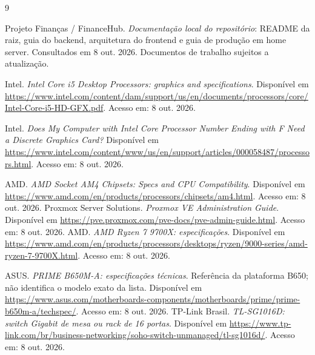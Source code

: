 \documentclass[11pt,a4paper,oneside]{report}
\begin{document}
\begin{thebibliography}{9}
 Projeto Finanças / FinanceHub.
\textit{Documentação local do repositório}: README da raiz, guia do backend,
arquitetura do frontend e guia de produção em home server.
Consultados em 8 out. 2026. Documentos de trabalho sujeitos a atualização.

 Intel.
\textit{Intel Core i5 Desktop Processors: graphics and specifications}.
Disponível em
\url{https://www.intel.com/content/dam/support/us/en/documents/processors/core/Intel-Core-i5-HD-GFX.pdf}.
Acesso em: 8 out. 2026.

 Intel.
\textit{Does My Computer with Intel Core Processor Number Ending with F Need a Discrete Graphics Card?}
Disponível em
\url{https://www.intel.com/content/www/us/en/support/articles/000058487/processors.html}.
Acesso em: 8 out. 2026.

 AMD.
\textit{AMD Socket AM4 Chipsets: Specs and CPU Compatibility}.
Disponível em \url{https://www.amd.com/en/products/processors/chipsets/am4.html}.
Acesso em: 8 out. 2026.
 Proxmox Server Solutions.
\textit{Proxmox VE Administration Guide}.
Disponível em \url{https://pve.proxmox.com/pve-docs/pve-admin-guide.html}.
Acesso em: 8 out. 2026.
 AMD.
\textit{AMD Ryzen 7 9700X: especificações}.
Disponível em
\url{https://www.amd.com/en/products/processors/desktops/ryzen/9000-series/amd-ryzen-7-9700X.html}.
Acesso em: 8 out. 2026.

 ASUS.
\textit{PRIME B650M-A: especificações técnicas}.
Referência da plataforma B650; não identifica o modelo exato da lista.
Disponível em
\url{https://www.asus.com/motherboards-components/motherboards/prime/prime-b650m-a/techspec/}.
Acesso em: 8 out. 2026.
 TP-Link Brasil.
\textit{TL-SG1016D: switch Gigabit de mesa ou rack de 16 portas}.
Disponível em
\url{https://www.tp-link.com/br/business-networking/soho-switch-unmanaged/tl-sg1016d/}.
Acesso em: 8 out. 2026.
\end{thebibliography}
\end{document}
